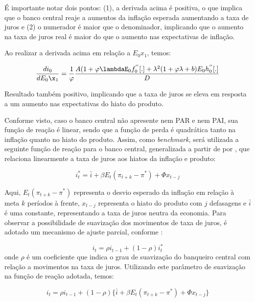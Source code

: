 \documentclass[
	article,			%
	11pt,				%
	oneside,			%
	a4paper,			%
	english,			%
	brazil,				%
	]{abntex2}
\begin{document}
	É importante notar dois pontos: (1), a derivada acima é positiva, o que implica que o banco central reaje a aumentos da inflação esperada aumentando a taxa de juros e (2) o numerador é maior que o denominador, implicando que o aumento na taxa de juros real é maior do que o aumento nas expectativas de inflação.
	
	Ao realizar a derivada acima em relação a $E_0x_1$, temos:
	
	\begin{equation}
		\frac{di_0}{dE_0\x_1} = \frac{1}{\varphi} \frac{A(1+\varphi\lambdaE_0f_0^{''}[.] + \lambda^2(1 + \varphi\lambda + b)E_0h_0^{''}[.]}{D} 
	\end{equation}
	
	Resultado também positivo, implicando que a taxa de juros se eleva em resposta a um aumento nas expectativas do hiato do produto.
	
	Conforme visto, caso o banco central não apresente nem PAR e nem PAI, sua função de reação é linear, sendo que a função de perda é quadrática tanto na inflação quanto no hiato do produto. Assim, como \textit{benchmark}, será utilizada a seguinte função de reação para o banco central, generalizada a partir de  por , que relaciona linearmente a taxa de juros aos hiatos da inflação e produto:
	
	\begin{equation}
		i_t^* = \bar{i} + \beta E_t(\pi_{t+k} - \pi^*) + \Phi x_{t-j}
	\end{equation}
	
	Aqui, $E_t(\pi_{t+k} - \pi^*)$ representa o desvio esperado da inflação em relação à meta $k$ períodos à frente, $x_{t-j}$ representa o hiato do produto com $j$ defasagens e $\bar{i}$ é uma constante, representando a taxa de juros neutra da economia. Para observar a possibilidade de suavização dos movimentos de taxa de juros, é adotado um mecanismo de ajuste parcial, conforme :
		
	\begin{equation}
		i_t = \rho i_{t-1} + (1-\rho) i_t^*
	\end{equation}
	onde $\rho$ é um coeficiente que indica o grau de suavização do banqueiro central com relação a movimentos na taxa de juros. Utilizando este parâmetro de suavização na função de reação adotada, temos:
	
	\begin{equation} \label{linear}
		i_t = \rho i_{t-1} + (1-\rho) \{ \bar{i} + \beta E_t(\pi_{t+k} - \pi^*) + \Phi x_{t-j} \}
	\end{equation}
	
\end{document}
